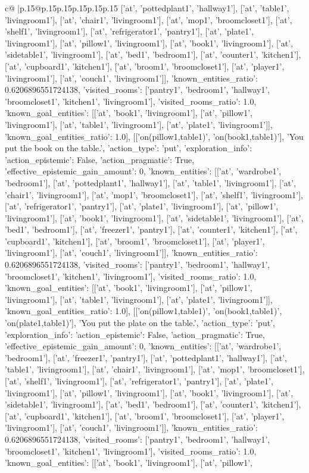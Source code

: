 \documentclass{article}
\begin{document}
{\begin{supertabular}{c@{$\;$}|p{.15\linewidth}@{}p{.15\linewidth}p{.15\linewidth}p{.15\linewidth}p{.15\linewidth}p{.15\linewidth}}
{{{['at', 'pottedplant1', 'hallway1'], ['at', 'table1', 'livingroom1'], ['at', 'chair1', 'livingroom1'], ['at', 'mop1', 'broomcloset1'], ['at', 'shelf1', 'livingroom1'], ['at', 'refrigerator1', 'pantry1'], ['at', 'plate1', 'livingroom1'], ['at', 'pillow1', 'livingroom1'], ['at', 'book1', 'livingroom1'], ['at', 'sidetable1', 'livingroom1'], ['at', 'bed1', 'bedroom1'], ['at', 'counter1', 'kitchen1'], ['at', 'cupboard1', 'kitchen1'], ['at', 'broom1', 'broomcloset1'], ['at', 'player1', 'livingroom1'], ['at', 'couch1', 'livingroom1']], 'known_entities_ratio': 0.6206896551724138, 'visited_rooms': ['pantry1', 'bedroom1', 'hallway1', 'broomcloset1', 'kitchen1', 'livingroom1'], 'visited_rooms_ratio': 1.0, 'known_goal_entities': [['at', 'book1', 'livingroom1'], ['at', 'pillow1', 'livingroom1'], ['at', 'table1', 'livingroom1'], ['at', 'plate1', 'livingroom1']], 'known_goal_entities_ratio': 1.0}}], [['on(pillow1,table1)', 'on(book1,table1)'], 'You put the book on the table.', {'action_type': 'put', 'exploration_info': {'action_epistemic': False, 'action_pragmatic': True, 'effective_epistemic_gain_amount': 0, 'known_entities': [['at', 'wardrobe1', 'bedroom1'], ['at', 'pottedplant1', 'hallway1'], ['at', 'table1', 'livingroom1'], ['at', 'chair1', 'livingroom1'], ['at', 'mop1', 'broomcloset1'], ['at', 'shelf1', 'livingroom1'], ['at', 'refrigerator1', 'pantry1'], ['at', 'plate1', 'livingroom1'], ['at', 'pillow1', 'livingroom1'], ['at', 'book1', 'livingroom1'], ['at', 'sidetable1', 'livingroom1'], ['at', 'bed1', 'bedroom1'], ['at', 'freezer1', 'pantry1'], ['at', 'counter1', 'kitchen1'], ['at', 'cupboard1', 'kitchen1'], ['at', 'broom1', 'broomcloset1'], ['at', 'player1', 'livingroom1'], ['at', 'couch1', 'livingroom1']], 'known_entities_ratio': 0.6206896551724138, 'visited_rooms': ['pantry1', 'bedroom1', 'hallway1', 'broomcloset1', 'kitchen1', 'livingroom1'], 'visited_rooms_ratio': 1.0, 'known_goal_entities': [['at', 'book1', 'livingroom1'], ['at', 'pillow1', 'livingroom1'], ['at', 'table1', 'livingroom1'], ['at', 'plate1', 'livingroom1']], 'known_goal_entities_ratio': 1.0}}], [['on(pillow1,table1)', 'on(book1,table1)', 'on(plate1,table1)'], 'You put the plate on the table.', {'action_type': 'put', 'exploration_info': {'action_epistemic': False, 'action_pragmatic': True, 'effective_epistemic_gain_amount': 0, 'known_entities': [['at', 'wardrobe1', 'bedroom1'], ['at', 'freezer1', 'pantry1'], ['at', 'pottedplant1', 'hallway1'], ['at', 'table1', 'livingroom1'], ['at', 'chair1', 'livingroom1'], ['at', 'mop1', 'broomcloset1'], ['at', 'shelf1', 'livingroom1'], ['at', 'refrigerator1', 'pantry1'], ['at', 'plate1', 'livingroom1'], ['at', 'pillow1', 'livingroom1'], ['at', 'book1', 'livingroom1'], ['at', 'sidetable1', 'livingroom1'], ['at', 'bed1', 'bedroom1'], ['at', 'counter1', 'kitchen1'], ['at', 'cupboard1', 'kitchen1'], ['at', 'broom1', 'broomcloset1'], ['at', 'player1', 'livingroom1'], ['at', 'couch1', 'livingroom1']], 'known_entities_ratio': 0.6206896551724138, 'visited_rooms': ['pantry1', 'bedroom1', 'hallway1', 'broomcloset1', 'kitchen1', 'livingroom1'], 'visited_rooms_ratio': 1.0, 'known_goal_entities': [['at', 'book1', 'livingroom1'], ['at', 'pillow1', }}}
\end{supertabular}}
\end{document}
